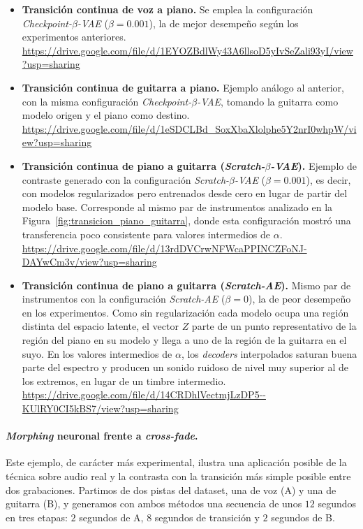 \documentclass[12pt,a4paper,twoside]{tesis}
\begin{document}
\begin{itemize}
    \item \textbf{Transición continua de voz a piano.} Se emplea la configuración \textit{Checkpoint-$\beta$-VAE} ($\beta=0.001$), la de mejor desempeño según los experimentos anteriores.\\
    \url{https://drive.google.com/file/d/1EYOZBdlWy43A6llsoD5yIvSeZali93yI/view?usp=sharing}

    \item \textbf{Transición continua de guitarra a piano.} Ejemplo análogo al anterior, con la misma configuración \textit{Checkpoint-$\beta$-VAE}, tomando la guitarra como modelo origen y el piano como destino.\\
    \url{https://drive.google.com/file/d/1eSDCLBd_SoxXbaXlolphe5Y2nrI0whpW/view?usp=sharing}

    \item \textbf{Transición continua de piano a guitarra (\textit{Scratch-$\beta$-VAE}).} Ejemplo de contraste generado con la configuración \textit{Scratch-$\beta$-VAE} ($\beta=0.001$), es decir, con modelos regularizados pero entrenados desde cero en lugar de partir del modelo base. Corresponde al mismo par de instrumentos analizado en la Figura~\ref{fig:transicion_piano_guitarra}, donde esta configuración mostró una transferencia poco consistente para valores intermedios de $\alpha$.\\
    \url{https://drive.google.com/file/d/13rdDVCrwNFWcaPPINCZFoNJ-DAYwCm3v/view?usp=sharing}

    \item \textbf{Transición continua de piano a guitarra (\textit{Scratch-AE}).} Mismo par de instrumentos con la configuración \textit{Scratch-AE} ($\beta=0$), la de peor desempeño en los experimentos. Como sin regularización cada modelo ocupa una región distinta del espacio latente, el vector $Z$ parte de un punto representativo de la región del piano en su modelo y llega a uno de la región de la guitarra en el suyo. En los valores intermedios de $\alpha$, los \textit{decoders} interpolados saturan buena parte del espectro y producen un sonido ruidoso de nivel muy superior al de los extremos, en lugar de un timbre intermedio.\\
    \url{https://drive.google.com/file/d/14CRDhlVectmjLzDP5--KUlRY0CI5kBS7/view?usp=sharing}
\end{itemize}

\paragraph{\emph{Morphing} neuronal frente a \textit{cross-fade}.} Este ejemplo, de carácter más experimental, ilustra una aplicación posible de la técnica sobre audio real y la contrasta con la transición más simple posible entre dos grabaciones. Partimos de dos pistas del dataset, una de voz (A) y una de guitarra (B), y generamos con ambos métodos una secuencia de unos $12$ segundos en tres etapas: $2$ segundos de A, $8$ segundos de transición y $2$ segundos de B.
\end{document}
